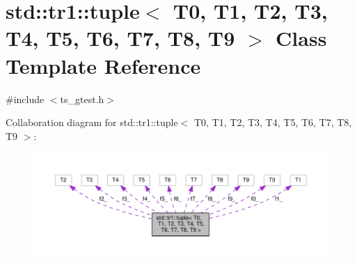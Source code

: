 \hypertarget{classstd_1_1tr1_1_1tuple}{\section{std\-:\-:tr1\-:\-:tuple$<$ T0, T1, T2, T3, T4, T5, T6, T7, T8, T9 $>$ Class Template Reference}
\label{classstd_1_1tr1_1_1tuple}
}


{\ttfamily \#include $<$ts\-\_\-gtest.\-h$>$}



Collaboration diagram for std\-:\-:tr1\-:\-:tuple$<$ T0, T1, T2, T3, T4, T5, T6, T7, T8, T9 $>$\-:\nopagebreak
\begin{figure}[H]
\begin{center}
\leavevmode
\includegraphics[width=350pt]{classstd_1_1tr1_1_1tuple__coll__graph}
\end{center}
\end{figure}
